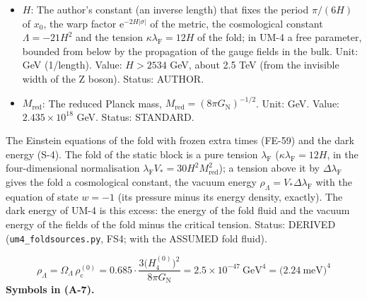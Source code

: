 \documentclass[
  10pt,
]{article}
\begin{document}
\begin{itemize}
  \(V_*\): The physical volume of the extra times \(x_5, x_6, x_7\) on
  the fold in the late universe,
  \(V_* = V_{\mathrm{t}}(\mathrm{e}^{-a_4}b_4)^3\) (with
  \(V_{\mathrm{t}} = \int\mathrm{d}x_5\,\mathrm{d}x_6\,\mathrm{d}x_7\)
  the coordinate volume of the extra times) at a time when
  \(\mathrm{e}^{-a_4}b_4\) is constant; it converts the
  eight-dimensional normalisation into the four-dimensional one. Unit:
  length\(^3\) (GeV\(^{-3}\)). Status: ASSUMED.
\item
  \(H\): The author's constant (an inverse length) that fixes the period
  \(\pi/(6H)\) of \(x_0\), the warp factor
  \(\mathrm{e}^{-2H\lvert\sigma\rvert}\) of the metric, the cosmological
  constant \(\Lambda = -21H^2\) and the tension
  \(\kappa\lambda_{\mathrm{F}} = 12H\) of the fold; in UM-4 a free
  parameter, bounded from below by the propagation of the gauge fields
  in the bulk. Unit: GeV (1/length). Value: \(H > 2534\) GeV, about 2.5
  TeV (from the invisible width of the Z boson). Status: AUTHOR.
\item
  \(M_{\mathrm{red}}\): The reduced Planck mass,
  \(M_{\mathrm{red}} = (8\pi G_{\mathrm{N}})^{-1/2}\). Unit: GeV. Value:
  \(2.435\times10^{18}\) GeV. Status: STANDARD.
\end{itemize}

The Einstein equations of the fold with frozen extra times (FE-59) and
the dark energy (S-4). The fold of the static block is a pure tension
\(\lambda_{\mathrm{F}}\) (\(\kappa\lambda_{\mathrm{F}} = 12H\), in the
four-dimensional normalisation
\(\lambda_{\mathrm{F}}V_* = 30H^2M_{\mathrm{red}}^2\)); a tension above
it by \(\Delta\lambda_{\mathrm{F}}\) gives the fold a cosmological
constant, the vacuum energy
\(\rho_\Lambda = V_*\Delta\lambda_{\mathrm{F}}\) with the equation of
state \(w = -1\) (its pressure minus its energy density, exactly). The
dark energy of UM-4 is this excess: the energy of the fold fluid and the
vacuum energy of the fields of the fold minus the critical tension.
Status: DERIVED (\texttt{um4\_foldsources.py}, FS4; with the ASSUMED
fold fluid).

\[
\rho_\Lambda = \Omega_\Lambda\,\rho_{\mathrm{c}}^{(0)} = 0.685\cdot\frac{3\big(H_4^{(0)}\big)^2}{8\pi G_{\mathrm{N}}} = 2.5\times10^{-47}\ \text{GeV}^4 = \big(2.24\ \text{meV}\big)^4 \tag{A-7}
\] \textbf{Symbols in (A-7).}
\end{document}
